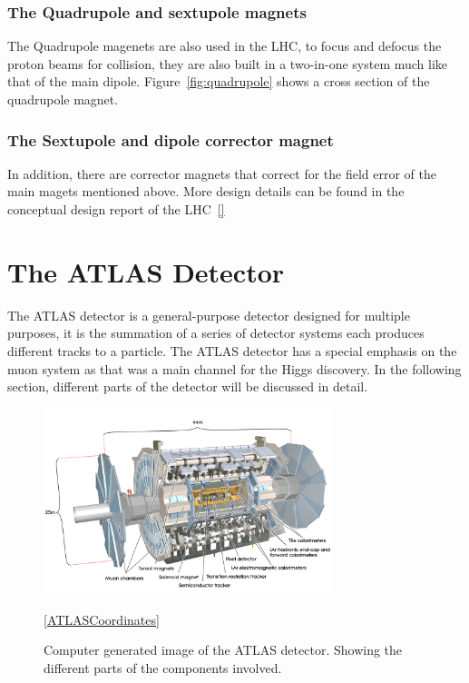 \subsubsection*{The Quadrupole and sextupole magnets}
The Quadrupole magenets are also used in the LHC, to focus and defocus the proton beams for collision, they are also built in a two-in-one system much like that of the main dipole. Figure~\ref{fig:quadrupole} shows a cross section of the quadrupole magnet. 

\subsubsection*{The Sextupole and dipole corrector magnet}
In addition, there are corrector magnets that correct for the field error of the main magets mentioned above. More design details can be found in the conceptual design report of the LHC~\ref{}








\section{The ATLAS Detector}
\label{ATLAS}

The ATLAS detector is a general-purpose detector designed for multiple purposes, it is the summation of a series of detector systems each produces different tracks to a particle. The ATLAS detector has a special emphasis on the muon system as that was a main channel for the Higgs discovery. In the following section, different parts of the detector will be discussed in detail. 

\begin{figure}[!htb]
    \begin{center}
        \includegraphics[width=0.75\textwidth]{figures/chapter_ATLAS/ATLASDetector}
        \caption{
			Computer generated image of the ATLAS detector\cite{Pequenao:1095924}. Showing the different parts of the components involved. 
        }
        \label{fig:Coordinates}
        \ref{ATLASCoordinates}
    \end{center}
\end{figure}


